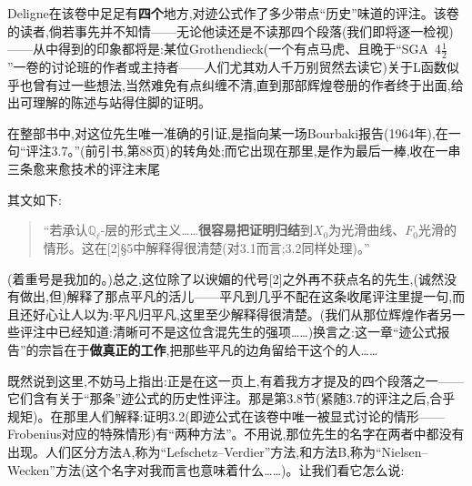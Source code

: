 Deligne在该卷中足足有\textbf{四个}地方,对迹公式作了多少带点“历史”味道的评注。该卷的读者,倘若事先并不知情——无论他读还是不读那四个段落(我们即将逐一检视)——从中得到的印象都将是:某位Grothendieck(一个有点马虎、且晚于“SGA~4$\frac{1}{2}$”一卷的讨论班的作者或主持者——人们尤其劝人千万别贸然去读它)关于L函数似乎也曾有过一些想法,当然难免有点纠缠不清,直到那部辉煌卷册的作者终于出面,给出可理解的陈述与站得住脚的证明。

在整部书中,对这位先生唯一准确的引证,是指向某一场Bourbaki报告(1964年),在一句“评注3.7。”(前引书,第88页)的转角处;而它出现在那里,是作为最后一棒,收在一串三条愈来愈技术的评注末尾

其文如下:

\begin{quote}
“若承认$\mathbb{Q}_\ell$-层的形式主义……\textbf{很容易把证明归结}到$X_0$为光滑曲线、$F_0$光滑的情形。这在[2]§5中解释得很清楚(对3.1而言;3.2同样处理)。”
\end{quote}

\dmark{}(着重号是我加的。)总之,这位除了以谀媚的代号[2]之外再不获点名的先生,(诚然没有做出,但)解释了那点平凡的活儿——平凡到几乎不配在这条收尾评注里提一句,而且还好心让人以为:平凡归平凡,这里至少解释得很清楚。(我们从那位辉煌作者另一些评注中已经知道:清晰可不是这位含混先生的强项……)换言之:这一章“迹公式报告”的宗旨在于\textbf{做真正的工作},把那些平凡的边角留给干这个的人……

既然说到这里,不妨马上指出:正是在这一页上,有着我方才提及的四个段落之一——它们含有关于“那条”迹公式的历史性评注。那是第3.8节(紧随3.7的评注之后,合乎规矩)。在那里人们解释:证明3.2(即迹公式在该卷中唯一被显式讨论的情形——Frobenius对应的特殊情形)有“两种方法”。不用说,那位先生的名字在两者中都没有出现。人们区分方法A,称为“Lefschetz--Verdier”方法,和方法B,称为“Nielsen--Wecken”方法(这个名字对我而言也意味着什么……)。让我们看它怎么说:


